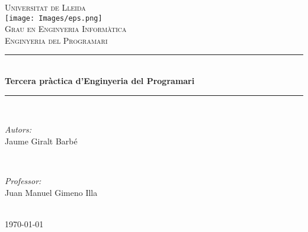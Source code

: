 \documentclass[11pt]{article}
\begin{document}
\begin{titlepage}

\newcommand{\HRule}{\rule{\linewidth}{0.5mm}} %

\center %


\textsc{\LARGE Universitat de Lleida}\\[1cm] %
\texttt{[image: Images/eps.png]}\\[0.65cm] %
\textsc{\Large Grau en Enginyeria Informàtica}\\[0.3cm] %
\textsc{\large Enginyeria del Programari}\\[0.5cm] %


\HRule \\[0.4cm]
{\huge \bfseries Tercera pràctica d'Enginyeria del Programari}\\[0.0cm]
\HRule \\[1cm]

\begin{minipage}{0.4\textwidth}
\begin{flushleft} \large
\emph{Autors:}\\
Jaume Giralt Barbé
\end{flushleft}
\end{minipage}
~
\begin{minipage}{0.4\textwidth}
\begin{flushright} \large
\emph{Professor:} \\
Juan Manuel Gimeno Illa
\end{flushright}
\end{minipage}\\[4cm]

{\large \today}\\[3cm] %
\vfill %
\end{titlepage}
\newpage
\tableofcontents
\clearpage
\newpage
\justify
\end{document}
